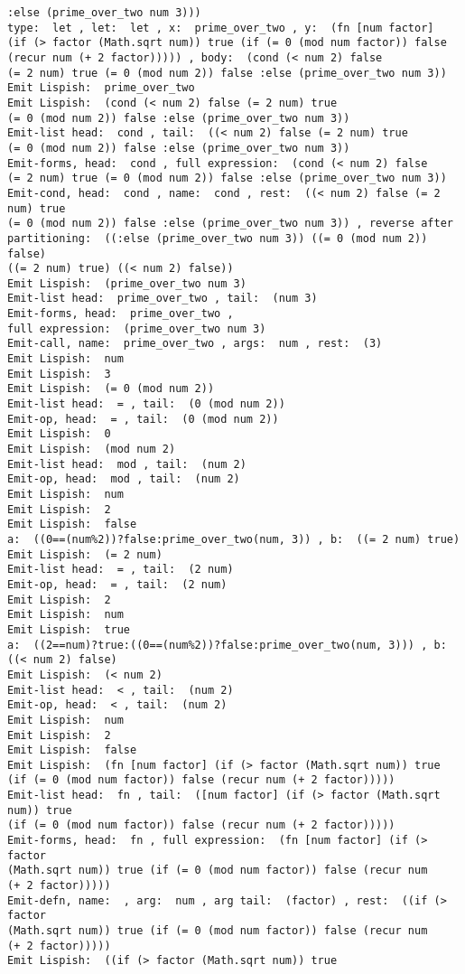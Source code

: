 \begin{verbatim}
:else (prime_over_two num 3)))
type:  let , let:  let , x:  prime_over_two , y:  (fn [num factor] 
(if (> factor (Math.sqrt num)) true (if (= 0 (mod num factor)) false 
(recur num (+ 2 factor))))) , body:  (cond (< num 2) false 
(= 2 num) true (= 0 (mod num 2)) false :else (prime_over_two num 3))
Emit Lispish:  prime_over_two
Emit Lispish:  (cond (< num 2) false (= 2 num) true 
(= 0 (mod num 2)) false :else (prime_over_two num 3))
Emit-list head:  cond , tail:  ((< num 2) false (= 2 num) true 
(= 0 (mod num 2)) false :else (prime_over_two num 3))
Emit-forms, head:  cond , full expression:  (cond (< num 2) false 
(= 2 num) true (= 0 (mod num 2)) false :else (prime_over_two num 3))
Emit-cond, head:  cond , name:  cond , rest:  ((< num 2) false (= 2 num) true 
(= 0 (mod num 2)) false :else (prime_over_two num 3)) , reverse after
partitioning:  ((:else (prime_over_two num 3)) ((= 0 (mod num 2)) false) 
((= 2 num) true) ((< num 2) false))
Emit Lispish:  (prime_over_two num 3)
Emit-list head:  prime_over_two , tail:  (num 3)
Emit-forms, head:  prime_over_two , 
full expression:  (prime_over_two num 3)
Emit-call, name:  prime_over_two , args:  num , rest:  (3)
Emit Lispish:  num
Emit Lispish:  3
Emit Lispish:  (= 0 (mod num 2))
Emit-list head:  = , tail:  (0 (mod num 2))
Emit-op, head:  = , tail:  (0 (mod num 2))
Emit Lispish:  0
Emit Lispish:  (mod num 2)
Emit-list head:  mod , tail:  (num 2)
Emit-op, head:  mod , tail:  (num 2)
Emit Lispish:  num
Emit Lispish:  2
Emit Lispish:  false
a:  ((0==(num%2))?false:prime_over_two(num, 3)) , b:  ((= 2 num) true)
Emit Lispish:  (= 2 num)
Emit-list head:  = , tail:  (2 num)
Emit-op, head:  = , tail:  (2 num)
Emit Lispish:  2
Emit Lispish:  num
Emit Lispish:  true
a:  ((2==num)?true:((0==(num%2))?false:prime_over_two(num, 3))) , b:  
((< num 2) false)
Emit Lispish:  (< num 2)
Emit-list head:  < , tail:  (num 2)
Emit-op, head:  < , tail:  (num 2)
Emit Lispish:  num
Emit Lispish:  2
Emit Lispish:  false
Emit Lispish:  (fn [num factor] (if (> factor (Math.sqrt num)) true 
(if (= 0 (mod num factor)) false (recur num (+ 2 factor)))))
Emit-list head:  fn , tail:  ([num factor] (if (> factor (Math.sqrt num)) true 
(if (= 0 (mod num factor)) false (recur num (+ 2 factor)))))
Emit-forms, head:  fn , full expression:  (fn [num factor] (if (> factor 
(Math.sqrt num)) true (if (= 0 (mod num factor)) false (recur num 
(+ 2 factor)))))
Emit-defn, name:  , arg:  num , arg tail:  (factor) , rest:  ((if (> factor 
(Math.sqrt num)) true (if (= 0 (mod num factor)) false (recur num 
(+ 2 factor)))))
Emit Lispish:  ((if (> factor (Math.sqrt num)) true 

\end{verbatim}
